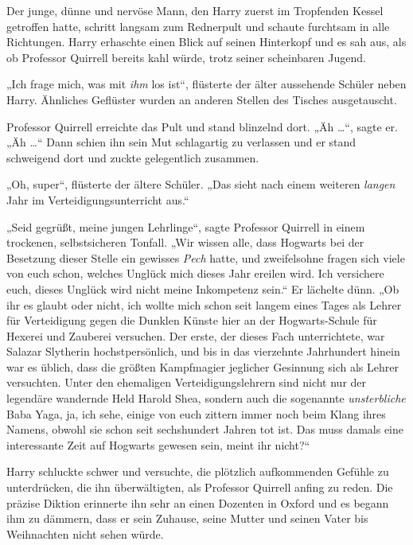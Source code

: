 {Der junge, dünne und nervöse Mann, den Harry zuerst im Tropfenden Kessel getroffen hatte, schritt langsam zum Rednerpult und schaute furchtsam in alle Richtungen. Harry erhaschte einen Blick auf seinen Hinterkopf und es sah aus, als ob Professor Quirrell bereits kahl würde, trotz seiner scheinbaren Jugend.

„Ich frage mich, was mit \emph{ihm} los ist“, flüsterte der älter aussehende Schüler neben Harry. Ähnliches Geflüster wurden an anderen Stellen des Tisches ausgetauscht.

Professor Quirrell erreichte das Pult und stand blinzelnd dort. „Äh …“, sagte er. „Äh …“ Dann schien ihn sein Mut schlagartig zu verlassen und er stand schweigend dort und zuckte gelegentlich zusammen.

„Oh, super“, flüsterte der ältere Schüler. „Das sieht nach einem weiteren \emph{langen} Jahr im Verteidigungsunterricht aus.“

„Seid gegrüßt, meine jungen Lehrlinge“, sagte Professor Quirrell in einem trockenen, selbstsicheren Tonfall. „Wir wissen alle, dass Hogwarts bei der Besetzung dieser Stelle ein gewisses \emph{Pech} hatte, und zweifelsohne fragen sich viele von euch schon, welches Unglück mich dieses Jahr ereilen wird. Ich versichere euch, dieses Unglück wird nicht meine Inkompetenz sein.“ Er lächelte dünn. „Ob ihr es glaubt oder nicht, ich wollte mich schon seit langem eines Tages als Lehrer für Verteidigung gegen die Dunklen Künste hier an der Hogwarts-Schule für Hexerei und Zauberei versuchen. Der erste, der dieses Fach unterrichtete, war Salazar Slytherin hochstpersönlich, und bis in das vierzehnte Jahrhundert hinein war es üblich, dass die größten Kampfmagier jeglicher Gesinnung sich als Lehrer versuchten. Unter den ehemaligen Verteidigungslehrern sind nicht nur der legendäre wandernde Held Harold Shea, sondern auch die sogenannte \emph{unsterbliche} Baba Yaga, ja, ich sehe, einige von euch zittern immer noch beim Klang ihres Namens, obwohl sie schon seit sechshundert Jahren tot ist. Das muss damals eine interessante Zeit auf Hogwarts gewesen sein, meint ihr nicht?“

Harry schluckte schwer und versuchte, die plötzlich aufkommenden Gefühle zu unterdrücken, die ihn überwältigten, als Professor Quirrell anfing zu reden. Die präzise Diktion erinnerte ihn sehr an einen Dozenten in Oxford und es begann ihm zu dämmern, dass er sein Zuhause, seine Mutter und seinen Vater bis Weihnachten nicht sehen würde.

}
